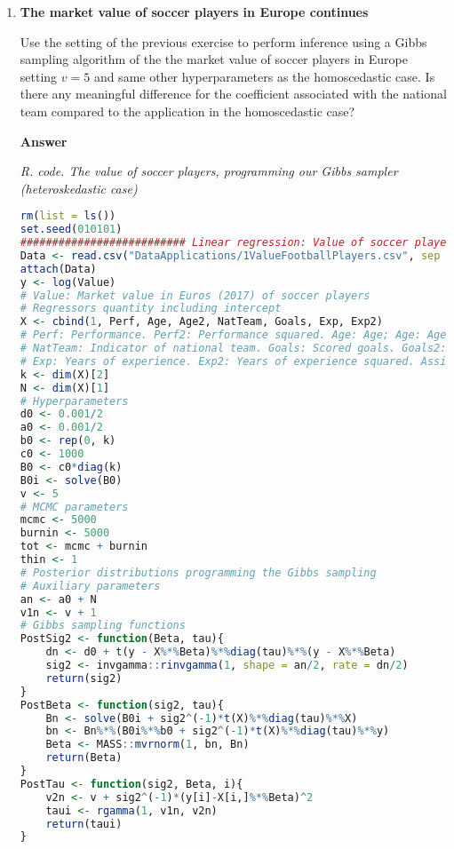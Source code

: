 \begin{enumerate}[leftmargin=*]
\item \textbf{The market value of soccer players in Europe continues}

Use the setting of the previous exercise to perform inference using a Gibbs sampling algorithm of the the market value of soccer players in Europe setting $v=5$ and same other hyperparameters as the homoscedastic case. Is there any meaningful difference for the coefficient associated with the national team compared to the application in the homoscedastic case?

\textbf{Answer}


\begin{tcolorbox}[enhanced,width=4.67in,center upper,
	fontupper=\large\bfseries,drop shadow southwest,sharp corners]
	\textit{R. code. The value of soccer players, programming our Gibbs sampler (heteroskedastic case)}
	\begin{VF}
		\begin{lstlisting}[language=R]		
rm(list = ls())
set.seed(010101)
########################## Linear regression: Value of soccer players ##########################
Data <- read.csv("DataApplications/1ValueFootballPlayers.csv", sep = ",", header = TRUE, fileEncoding = "latin1")
attach(Data)
y <- log(Value) 
# Value: Market value in Euros (2017) of soccer players
# Regressors quantity including intercept
X <- cbind(1, Perf, Age, Age2, NatTeam, Goals, Exp, Exp2)
# Perf: Performance. Perf2: Performance squared. Age: Age; Age: Age squared. 
# NatTeam: Indicator of national team. Goals: Scored goals. Goals2: Scored goals squared
# Exp: Years of experience. Exp2: Years of experience squared. Assists: Number of assists
k <- dim(X)[2]
N <- dim(X)[1]
# Hyperparameters
d0 <- 0.001/2
a0 <- 0.001/2
b0 <- rep(0, k)
c0 <- 1000
B0 <- c0*diag(k)
B0i <- solve(B0)
v <- 5
# MCMC parameters
mcmc <- 5000
burnin <- 5000
tot <- mcmc + burnin
thin <- 1
# Posterior distributions programming the Gibbs sampling
# Auxiliary parameters
an <- a0 + N
v1n <- v + 1
# Gibbs sampling functions
PostSig2 <- function(Beta, tau){
	dn <- d0 + t(y - X%*%Beta)%*%diag(tau)%*%(y - X%*%Beta)
	sig2 <- invgamma::rinvgamma(1, shape = an/2, rate = dn/2)
	return(sig2)
}
PostBeta <- function(sig2, tau){
	Bn <- solve(B0i + sig2^(-1)*t(X)%*%diag(tau)%*%X)
	bn <- Bn%*%(B0i%*%b0 + sig2^(-1)*t(X)%*%diag(tau)%*%y)
	Beta <- MASS::mvrnorm(1, bn, Bn)
	return(Beta)
}
PostTau <- function(sig2, Beta, i){
	v2n <- v + sig2^(-1)*(y[i]-X[i,]%*%Beta)^2
	taui <- rgamma(1, v1n, v2n)
	return(taui)
}			
\end{lstlisting}
	\end{VF}
\end{tcolorbox} 


\end{enumerate}

